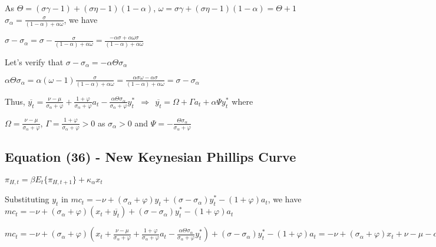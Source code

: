 \documentclass[
]{article}
\begin{document}
As \(\Theta = (\sigma \gamma-1)+(\sigma \eta-1)(1-\alpha)\),
\(\omega=\sigma \gamma+(\sigma \eta-1)(1-\alpha)=\Theta+1\)
\(\displaystyle \sigma_\alpha = \frac{\sigma}{(1-\alpha)+\alpha \omega}\),
we have

\(\displaystyle \sigma-\sigma_\alpha=\sigma- \frac{\sigma}{(1-\alpha)+\alpha \omega}=\frac{-\alpha \sigma +\alpha \omega\sigma}{(1-\alpha)+\alpha \omega}\)

Let's verify that
\(\sigma-\sigma_\alpha = - \alpha \Theta \sigma_\alpha\)

\(\displaystyle \alpha \Theta \sigma_\alpha= \alpha (\omega-1) \frac{\sigma}{(1-\alpha)+\alpha \omega} = \frac{\alpha \sigma \omega -\alpha \sigma}{(1-\alpha)+\alpha \omega}=\sigma-\sigma_\alpha\)

Thus,
\(\displaystyle \overline{y_t} = \frac{\nu -\mu}{\sigma_\alpha+\varphi} + \frac{1+\varphi}{\sigma_\alpha+\varphi}a_t - \frac{ \alpha \Theta \sigma_\alpha}{\sigma_\alpha+\varphi}y_t^* \ \ \Rightarrow \ \ \overline{y_t} =\Omega+\Gamma a_t+ \alpha \Psi y_t^*\)
where

\(\displaystyle \Omega = \frac{\nu -\mu}{\sigma_\alpha+\varphi}\),
\(\displaystyle \Gamma = \frac{1+\varphi}{\sigma_\alpha+\varphi}>0\) as
\(\sigma_\alpha>0\) and
\(\displaystyle \Psi=-\frac{\Theta \sigma_\alpha}{\sigma_\alpha + \varphi}\)

\vspace{12pt}

\hypertarget{equation-36---new-keynesian-phillips-curve}{%
\subsection{Equation (36) - New Keynesian Phillips
Curve}\label{equation-36---new-keynesian-phillips-curve}}

\(\pi_{H,t} = \beta E_t \{ \pi_{H,t+1}\} + \kappa_\alpha x_t\)

Substituting \(y_t\) in
\(mc_t = -\nu + (\sigma_\alpha+\varphi)y_t + (\sigma-\sigma_\alpha)y_t^*-(1+\varphi)a_t\),
we have
\(mc_t = -\nu + (\sigma_\alpha+\varphi)(x_t+\overline{y_t}) + (\sigma-\sigma_\alpha)y_t^*-(1+\varphi)a_t\)

\(\displaystyle mc_t = -\nu + (\sigma_\alpha+\varphi)\left(x_t+\frac{\nu -\mu}{\sigma_\alpha+\varphi} + \frac{1+\varphi}{\sigma_\alpha+\varphi}a_t - \frac{ \alpha \Theta \sigma_\alpha}{\sigma_\alpha+\varphi}y_t^* \right) + (\sigma-\sigma_\alpha)y_t^*-(1+\varphi)a_t = -\nu + (\sigma_\alpha+\varphi)x_t + \nu - \mu - \alpha \Theta \sigma_\alpha y_t^* + (\sigma-\sigma_\alpha)y_t^*\)
\end{document}
